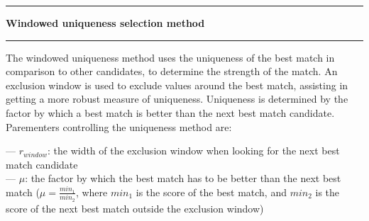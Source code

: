 \noindent\rule{\textwidth}{1pt}
\indent \textbf{Windowed uniqueness selection method}
\noindent\rule{\textwidth}{1pt}
\smallskip
\parbox{\textwidth}{The windowed uniqueness method uses the uniqueness of the best match in comparison to other candidates, to determine the strength of the match. An exclusion window is used to exclude values around the best match, assisting in getting a more robust measure of uniqueness. Uniqueness is determined by the factor by which a best match is better than the next best match candidate. Parementers controlling the uniqueness method are:}
\parbox{\textwidth}{--- $r_{window}$: the width of the exclusion window when looking for the next best match candidate \\ --- $\mu$: the factor by which the best match has to be better than the next best match ($\mu=\frac{min_1}{min_2}$, where $min_1$ is the score of the best match, and $min_2$ is the score of the next best match outside the exclusion window)}
\smallskip
